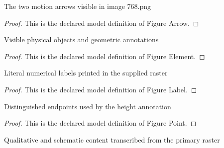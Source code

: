 \begin{definition}
  \label{def:physics:phyx-mini-0768:phyxminiproblems-problemphyxmini0768-figurearrow}
  The two motion arrows visible in image 768.png
\end{definition}
\begin{proof}
  This is the declared model definition of Figure Arrow.
\end{proof}
\begin{definition}
  \label{def:physics:phyx-mini-0768:phyxminiproblems-problemphyxmini0768-figureelement}
  Visible physical objects and geometric annotations
\end{definition}
\begin{proof}
  This is the declared model definition of Figure Element.
\end{proof}
\begin{definition}
  \label{def:physics:phyx-mini-0768:phyxminiproblems-problemphyxmini0768-figurelabel}
  Literal numerical labels printed in the supplied raster
\end{definition}
\begin{proof}
  This is the declared model definition of Figure Label.
\end{proof}
\begin{definition}
  \label{def:physics:phyx-mini-0768:phyxminiproblems-problemphyxmini0768-figurepoint}
  Distinguished endpoints used by the height annotation
\end{definition}
\begin{proof}
  This is the declared model definition of Figure Point.
\end{proof}
\begin{definition}
  \label{def:physics:phyx-mini-0768:phyxminiproblems-problemphyxmini0768-shippingcartfigure}
  Qualitative and schematic content transcribed from the primary raster
\end{definition}
